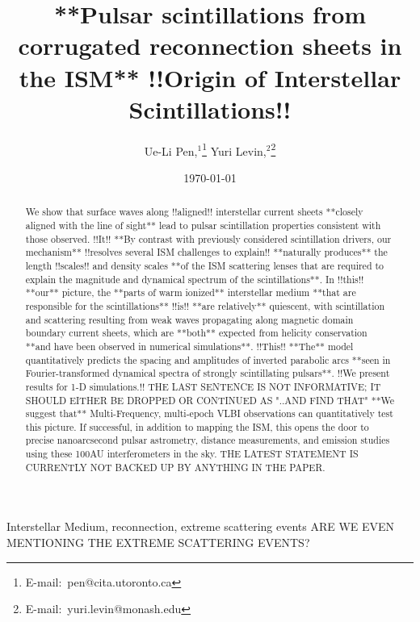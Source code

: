 \documentclass[useAMS,usenatbib]{mn2e}
\title[Interstellar Plasma Scattering]{
**Pulsar scintillations from corrugated reconnection sheets in the ISM**
!!Origin of Interstellar Scintillations!! 
}
\author[Pen and Levin]{Ue-Li
  Pen,$^{1}$\thanks{E-mail:\ pen@cita.utoronto.ca}
Yuri Levin,$^2$\thanks{E-mail:\ yuri.levin@monash.edu}
}
\begin{document}
\date{\today}

\pagerange{\pageref{firstpage}--\pageref{lastpage}} 

\maketitle
\label{firstpage}
\begin{abstract}

We show that surface waves along !!aligned!! interstellar current sheets **closely aligned
with the line of sight**
lead to pulsar scintillation properties consistent with those
observed.  !!It!! **By contrast with previously considered scintillation drivers, our mechanism** !!resolves several ISM challenges to explain!! **naturally
produces** the length
!!scales!! and density scales **of the ISM scattering lenses that are required to explain the magnitude and
dynamical spectrum of the scintillations**.  In !!this!! **our** picture, the **parts of warm ionized** interstellar
medium **that are responsible for the scintillations** !!is!! **are relatively** quiescent, with scintillation and scattering resulting from
weak waves propagating along magnetic domain boundary current sheets,
which are **both** expected from helicity conservation **and have been observed in numerical
simulations**.  !!This!! **The** model
quantitatively predicts the spacing and amplitudes of inverted
parabolic arcs **seen in Fourier-transformed dynamical spectra of strongly scintillating pulsars**.  !!We present results for 1-D simulations.!! THE LAST SENTENCE IS NOT INFORMATIVE; IT SHOULD EITHER
BE DROPPED OR CONTINUED AS "..AND FIND THAT"
**We suggest that** Multi-Frequency, multi-epoch VLBI observations can quantitatively test
this picture.  If successful, in addition to mapping the ISM, this
opens the door to precise nanoarcsecond pulsar astrometry, distance
measurements, and emission studies using these 100AU interferometers
in the sky. THE LATEST STATEMENT IS CURRENTLY NOT BACKED UP BY ANYTHING IN THE PAPER.

\end{abstract}
\begin{keywords}
Interstellar Medium, reconnection, extreme scattering events ARE WE EVEN MENTIONING THE 
EXTREME SCATTERING EVENTS?
\end{keywords}

\newcommand{\be}{\begin{eqnarray}}
\newcommand{\ee}{\end{eqnarray}}
\newcommand{\beq}{\begin{equation}}
\newcommand{\eeq}{\end{equation}}
\end{document}
